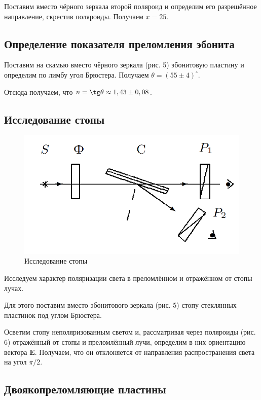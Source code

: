 \documentclass[12pt]{kiarticle}
\begin{document}
Поставим вместо чёрного зеркала второй поляроид и определим
его разрешённое направление, скрестив поляроиды. Получаем $ x = 25 $. 

\subsection{Определение показателя преломления эбонита}

Поставим на скамью вместо чёрного зеркала (рис. 5) эбонитовую
пластину и определим по лимбу угол Брюстера. Получаем $ \theta =(55 \pm 4) ^\circ$. 

Отсюда получаем, что $ n = \tg \theta \approx 1,43 \pm 0,08 $. 

\subsection{Исследование стопы}

\begin{figure}
	\includegraphics[width=\linewidth]{6}
	\caption{Исследование стопы}
	\label{ris 6}
\end{figure}

Исследуем характер поляризации света в преломлённом и отражённом от стопы лучах. 

Для этого поставим вместо эбонитового зеркала (рис. 5) стопу стеклянных пластинок под углом Брюстера.

Осветим стопу неполяризованным светом и, рассматривая через поляроиды (рис. 6) отражённый от стопы и преломлённый лучи, определим в них ориентацию вектора $ \mathbf{E} $. Получаем, что он отклоняется от направления распространения света на угол $ \pi/2 $.

\subsection{Двоякопреломляющие пластины}
\end{document}
